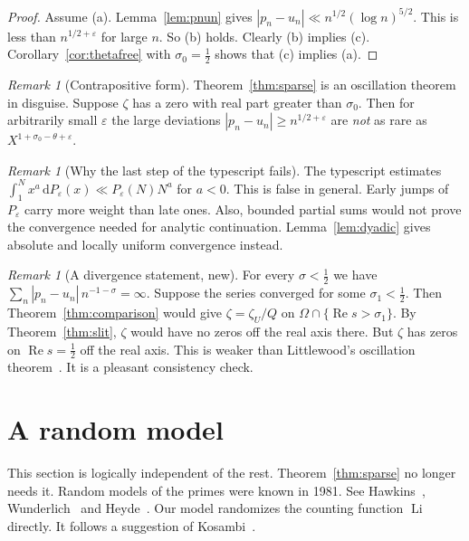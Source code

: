 \documentclass[12pt,letterpaper]{article}
\theoremstyle{definition}
\theoremstyle{remark}
\newtheorem{remark}[theorem]{Remark}
\newcommand{\Li}{\operatorname{Li}}
\newcommand{\Ree}{\operatorname{Re}}
\newcommand{\dd}{\,\mathrm{d}}
\newcommand{\eps}{\varepsilon}
\begin{document}
\begin{proof}
Assume (a). Lemma~\ref{lem:pnun} gives $|p_n-u_n|\ll n^{1/2}(\log
n)^{5/2}$. This is less than $n^{1/2+\eps}$ for large $n$. So (b) holds.
Clearly (b) implies (c). Corollary~\ref{cor:thetafree} with
$\sigma_0=\frac12$ shows that (c) implies (a).
\end{proof}

\begin{remark}[Contrapositive form]
Theorem~\ref{thm:sparse} is an oscillation theorem in disguise. Suppose
$\zeta$ has a zero with real part greater than $\sigma_0$. Then for
arbitrarily small $\eps$ the large deviations $|p_n-u_n|\ge n^{1/2+\eps}$
are \emph{not} as rare as $X^{1+\sigma_0-\theta+\eps}$.
\end{remark}

\begin{remark}[Why the last step of the typescript fails]
The typescript estimates $\int_1^N x^a\dd P_\eps(x)\ll P_\eps(N)N^a$ for
$a<0$. This is false in general. Early jumps of $P_\eps$ carry more weight
than late ones. Also, bounded partial sums would not prove the convergence
needed for analytic continuation. Lemma~\ref{lem:dyadic} gives absolute and
locally uniform convergence instead.
\end{remark}

\begin{remark}[A divergence statement, new]
For every $\sigma<\frac12$ we have $\sum_n|p_n-u_n|\,n^{-1-\sigma}=\infty$.
Suppose the series converged for some $\sigma_1<\frac12$. Then
Theorem~\ref{thm:comparison} would give $\zeta=\zeta_U/Q$ on
$\Omega\cap\{\Ree s>\sigma_1\}$. By Theorem~\ref{thm:slit}, $\zeta$ would
have no zeros off the real axis there. But $\zeta$ has zeros on
$\Ree s=\frac12$ off the real axis. This is weaker than Littlewood's
oscillation theorem~\cite{Li14}. It is a pleasant consistency check.
\end{remark}

\section{A random model}\label{sec:random}

This section is logically independent of the rest. Theorem~\ref{thm:sparse}
no longer needs it. Random models of the primes were known in 1981. See
Hawkins~\cite{Ha58}, Wunderlich~\cite{Wu74} and
Heyde~\cite{He78}. Our model randomizes the counting function
$\Li$ directly. It follows a suggestion of Kosambi~\cite{Ko59}.
\end{document}
